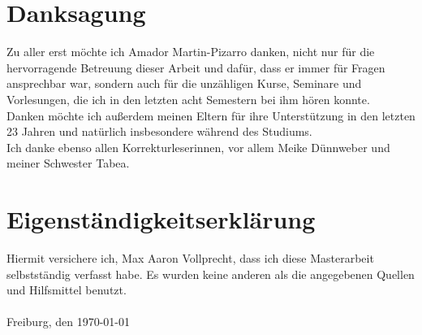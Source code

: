 \chapter*{Danksagung}
Zu aller erst möchte ich Amador Martin-Pizarro danken, nicht nur für die hervorragende Betreuung dieser Arbeit und dafür, dass er immer für Fragen ansprechbar war, sondern auch für die unzähligen Kurse, Seminare und Vorlesungen, die ich in den letzten acht Semestern bei ihm hören konnte.\\
Danken möchte ich außerdem meinen Eltern für ihre Unterstützung in den letzten 23 Jahren und natürlich insbesondere während des Studiums.\\
Ich danke ebenso allen Korrekturleserinnen, vor allem Meike Dünnweber und meiner Schwester Tabea.
\chapter*{Eigenständigkeitserklärung}
\vspace{0.8cm}
Hiermit versichere ich, Max Aaron Vollprecht, dass ich diese Masterarbeit selbstständig verfasst habe. Es wurden keine anderen als die angegebenen Quellen und Hilfsmittel benutzt.
\\ \\
Freiburg, den \today
\newpage
{}
